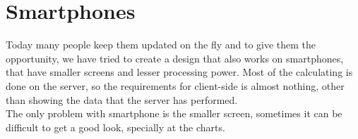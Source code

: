 \chapter{Smartphones}
Today many people keep them updated on the fly and to give them the opportunity, we have tried to create a design that also works on smartphones, that have smaller screens and lesser processing power. Most of the calculating is done on the server, so the requirements for client-side is almost nothing, other than showing the data that the server has performed.\\
The only problem with smartphone is the smaller screen, sometimes it can be difficult to get a good look, specially at the charts.